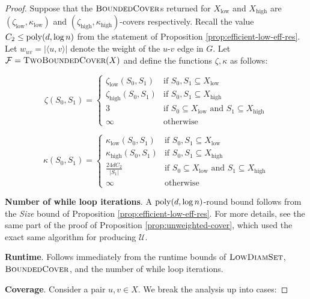 \begin{proof}
Suppose that the $\textsc{BoundedCover}$s returned for $X_{\text{low}}$ and $X_{\text{high}}$ are $(\zeta_{\text{low}},\kappa_{\text{low}})$ and $(\zeta_{\text{high}},\kappa_{\text{high}})$-covers respectively. Recall the value $C_2\le \mathrm{poly}(d,\log n)$ from the statement of Proposition \ref{prop:efficient-low-eff-res}. Let $w_{uv} = |\langle u,v\rangle|$ denote the weight of the $u$-$v$ edge in $G$. Let $\mathcal F = \textsc{TwoBoundedCover}(X)$ and define the functions $\zeta,\kappa$ as follows:

\[
  \zeta(S_0,S_1) =
  \begin{cases}
                                   \zeta_{\text{low}}(S_0,S_1) & \text{if $S_0,S_1\subseteq X_{\text{low}}$} \\
                                   \zeta_{\text{high}}(S_0,S_1) & \text{if $S_0,S_1\subseteq X_{\text{high}}$} \\
                                    3 & \text{if $S_0\subseteq X_{\text{low}}$ and $S_1\subseteq X_{\text{high}}$} \\
                                    \infty & \text{otherwise}
  \end{cases}
\]

\[
  \kappa(S_0,S_1) =
  \begin{cases}
                                   \kappa_{\text{low}}(S_0,S_1) & \text{if $S_0,S_1\subseteq X_{\text{low}}$} \\
                                   \kappa_{\text{high}}(S_0,S_1) & \text{if $S_0,S_1\subseteq X_{\text{high}}$} \\
                                    \frac{24 d C_2}{|S_1|} & \text{if $S_0\subseteq X_{\text{low}}$ and $S_1\subseteq X_{\text{high}}$} \\
                                    \infty & \text{otherwise}
  \end{cases}
\]


\textbf{Number of while loop iterations}. A $\mathrm{poly}(d,\log n)$-round bound follows from the \emph{Size} bound of Proposition \ref{prop:efficient-low-eff-res}. For more details, see the same part of the proof of Proposition \ref{prop:unweighted-cover}, which used the exact same algorithm for producing $\mathcal U$.

\textbf{Runtime}. Follows immediately from the runtime bounds of $\textsc{LowDiamSet}$, $\textsc{BoundedCover}$, and the number of while loop iterations.

\textbf{Coverage}. Consider a pair $u,v\in X$. We break the analysis up into cases:


\end{proof}
